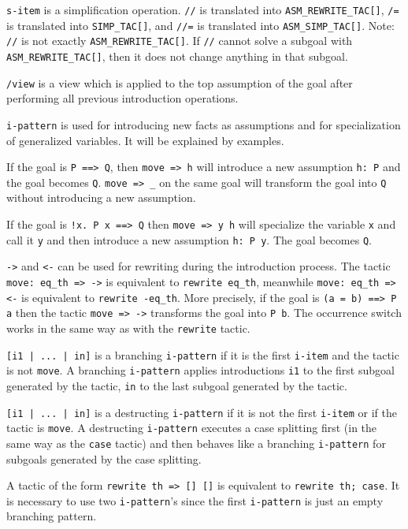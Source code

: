 \documentclass[a4paper]{article}
\begin{document}
\verb|s-item| is a simplification operation. \verb|//| is translated into \verb|ASM_REWRITE_TAC[]|, \verb|/=| is translated into \verb|SIMP_TAC[]|, and \verb|//=| is translated into \verb|ASM_SIMP_TAC[]|. Note: \verb|//| is not exactly \verb|ASM_REWRITE_TAC[]|. If \verb|//| cannot solve a subgoal with \verb|ASM_REWRITE_TAC[]|, then it does not change anything in that subgoal.

\verb|/view| is a view which is applied to the top assumption of the goal after performing all previous introduction operations.

\verb|i-pattern| is used for introducing new facts as assumptions and for specialization of generalized variables. It will be explained by examples.

If the goal is \verb|P ==> Q|, then \verb|move => h| will introduce a new assumption \verb|h: P| and the goal becomes \verb|Q|. \verb|move => _| on the same goal will transform the goal into \verb|Q| without introducing a new assumption.

If the goal is \verb|!x. P x ==> Q| then \verb|move => y h| will specialize the variable \verb|x| and call it \verb|y| and then introduce a new assumption \verb|h: P y|. The goal becomes \verb|Q|.

\verb|->| and \verb|<-| can be used for rewriting during the introduction process. The tactic \verb|move: eq_th => ->| is equivalent to \verb|rewrite eq_th|, meanwhile \verb|move: eq_th => <-| is equivalent to \verb|rewrite -eq_th|. More precisely, if the goal is \verb|(a = b) ==> P a| then the tactic \verb|move => ->| transforms the goal into \verb|P b|. The occurrence switch works in the same way as with the \verb|rewrite| tactic.

\verb$[i1 | ... | in]$ is a branching \verb|i-pattern| if it is the first \verb|i-item| and the tactic is not \verb|move|. A branching \verb|i-pattern| applies introductions \verb|i1| to the first subgoal generated by the tactic, \verb|in| to the last subgoal generated by the tactic.

\verb$[i1 | ... | in]$ is a destructing \verb|i-pattern| if it is not the first \verb|i-item| or if the tactic is \verb|move|. A destructing \verb|i-pattern| executes a case splitting first (in the same way as the \verb|case| tactic) and then behaves like a branching \verb|i-pattern| for subgoals generated by the case splitting.

A tactic of the form \verb|rewrite th => [] []| is equivalent to \verb|rewrite th; case|. It is necessary to use two \verb|i-pattern|'s since the first \verb|i-pattern| is just an empty branching pattern.
\end{document}
